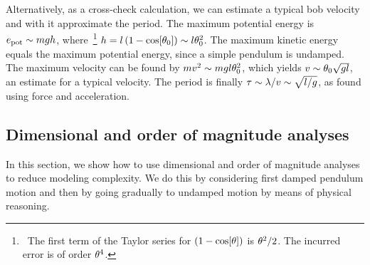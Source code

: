 Alternatively, as a cross-check calculation, we can estimate a typical bob velocity and with it approximate the period. The maximum potential energy is $e_\text{pot}\sim mgh$, where~\footnote{~The first term of the Taylor series for $\left(1 - \cos\!\left[{\theta}\right]\right)$ is $\theta^2/2$. The incurred error is of order $\theta^4$.} $h = l\left(1 - \cos\!\left[{\theta_0}\right]\right)\sim l\theta_0^2$. The maximum kinetic energy equals the maximum potential energy, since a simple pendulum is undamped. The maximum velocity can be found by $mv^2\sim mgl\theta_0^2$, which yields $v\sim\theta_0\sqrt{gl}$, an estimate for a typical velocity. The period is finally $\tau\sim\lambda/v\sim\sqrt{l/g}$, as found using force and acceleration.



\subsection{Dimensional and order of magnitude analyses}\label{subsec:dimanalysisorderofmag}
In this section, we show how to use dimensional and order of magnitude analyses to reduce modeling complexity. We do this by considering first damped pendulum motion and then by going gradually to undamped motion by means of physical reasoning.


